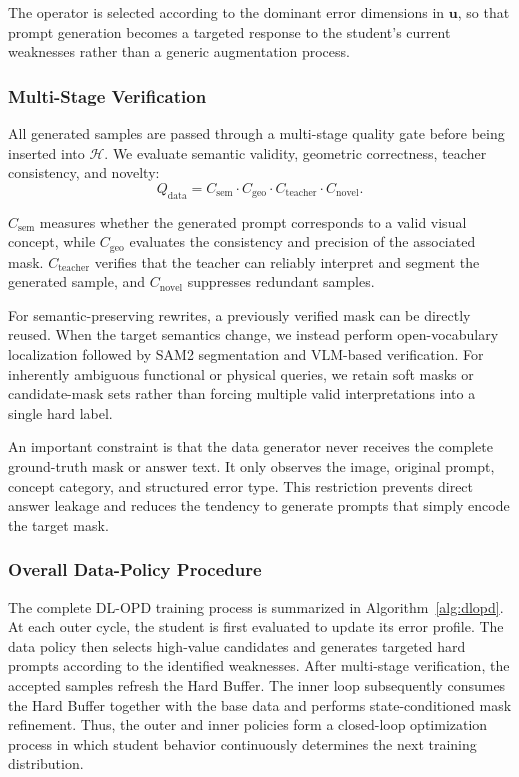 The operator is selected according to the dominant error dimensions in
$\mathbf{u}$, so that prompt generation becomes a targeted response to
the student's current weaknesses rather than a generic augmentation
process.

\subsubsection{Multi-Stage Verification}
\label{subsec:data_verification}

All generated samples are passed through a multi-stage quality gate before
being inserted into $\mathcal{H}$. We evaluate semantic validity,
geometric correctness, teacher consistency, and novelty:
\begin{equation}
Q_{\mathrm{data}}
=
C_{\mathrm{sem}}
\cdot
C_{\mathrm{geo}}
\cdot
C_{\mathrm{teacher}}
\cdot
C_{\mathrm{novel}}.
\label{eq:data_quality}
\end{equation}

$C_{\mathrm{sem}}$ measures whether the generated prompt corresponds to a
valid visual concept, while $C_{\mathrm{geo}}$ evaluates the consistency
and precision of the associated mask. $C_{\mathrm{teacher}}$ verifies
that the teacher can reliably interpret and segment the generated sample,
and $C_{\mathrm{novel}}$ suppresses redundant samples.

For semantic-preserving rewrites, a previously verified mask can be
directly reused. When the target semantics change, we instead perform
open-vocabulary localization followed by SAM2 segmentation and
VLM-based verification. For inherently ambiguous functional or physical
queries, we retain soft masks or candidate-mask sets rather than forcing
multiple valid interpretations into a single hard label.

An important constraint is that the data generator never receives the
complete ground-truth mask or answer text. It only observes the image,
original prompt, concept category, and structured error type. This
restriction prevents direct answer leakage and reduces the tendency to
generate prompts that simply encode the target mask.

\subsubsection{Overall Data-Policy Procedure}
\label{subsec:data_policy_algorithm}

The complete DL-OPD training process is summarized in
Algorithm~\ref{alg:dlopd}. At each outer cycle, the student is first
evaluated to update its error profile. The data policy then selects
high-value candidates and generates targeted hard prompts according to
the identified weaknesses. After multi-stage verification, the accepted
samples refresh the Hard Buffer. The inner loop subsequently consumes
the Hard Buffer together with the base data and performs state-conditioned
mask refinement. Thus, the outer and inner policies form a closed-loop
optimization process in which student behavior continuously determines
the next training distribution.

